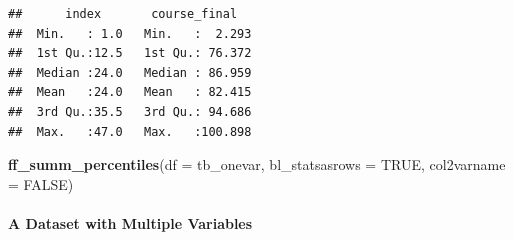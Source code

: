 \documentclass[
]{book}
\newenvironment{Shaded}{\begin{snugshade}}{\end{snugshade}}
\newcommand{\DataTypeTok}[1]{\textcolor[rgb]{0.13,0.29,0.53}{#1}}
\newcommand{\KeywordTok}[1]{\textcolor[rgb]{0.13,0.29,0.53}{\textbf{#1}}}
\newcommand{\NormalTok}[1]{#1}
\newcommand{\OtherTok}[1]{\textcolor[rgb]{0.56,0.35,0.01}{#1}}
\begin{document}
\begin{verbatim}
##      index       course_final    
##  Min.   : 1.0   Min.   :  2.293  
##  1st Qu.:12.5   1st Qu.: 76.372  
##  Median :24.0   Median : 86.959  
##  Mean   :24.0   Mean   : 82.415  
##  3rd Qu.:35.5   3rd Qu.: 94.686  
##  Max.   :47.0   Max.   :100.898
\end{verbatim}

\begin{Shaded}
\begin{Highlighting}[]
\KeywordTok{ff\_summ\_percentiles}\NormalTok{(}\DataTypeTok{df =}\NormalTok{ tb\_onevar, }\DataTypeTok{bl\_statsasrows =} \OtherTok{TRUE}\NormalTok{, }\DataTypeTok{col2varname =} \OtherTok{FALSE}\NormalTok{)}
\end{Highlighting}
\end{Shaded}

\hypertarget{a-dataset-with-multiple-variables}{%
\paragraph{A Dataset with Multiple Variables}\label{a-dataset-with-multiple-variables}}
\end{document}
